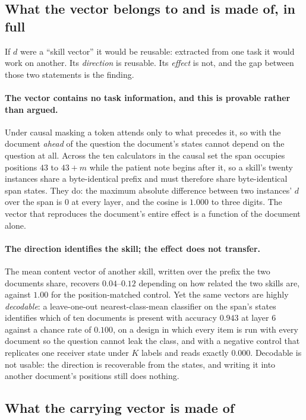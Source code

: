 \documentclass{article}
\newcommand{\dvec}{\ensuremath{d}}
\begin{document}
\subsection{What the vector belongs to and is made of, in full}
\label{app:belongs}

If $\dvec$ were a ``skill vector'' it would be reusable: extracted from one task
it would work on another. Its \emph{direction} is reusable. Its \emph{effect} is
not, and the gap between those two statements is the finding.

\paragraph{The vector contains no task information, and this is provable rather
than argued.} Under causal masking a token attends only to what precedes it, so
with the document \emph{ahead} of the question the document's states cannot
depend on the question at all. Across the ten calculators in the causal set the
span occupies positions $43$ to $43+m$ while the patient note begins after it,
so a skill's twenty instances share a byte-identical prefix and must therefore
share byte-identical span states. They do: the maximum absolute difference
between two instances' $\dvec$ over the span is $0$ at every layer, and the
cosine is $1.000$ to three digits. The vector that reproduces the document's
entire effect is a function of the document alone.

\paragraph{The direction identifies the skill; the effect does not transfer.}
The mean content vector of another skill, written over the prefix the two
documents share, recovers $0.04$--$0.12$ depending on how related the two
skills are, against $1.00$ for the position-matched control. Yet the same
vectors are highly \emph{decodable}: a leave-one-out nearest-class-mean
classifier on the span's states identifies which of ten documents is present
with accuracy $0.943$ at layer 6 against a chance rate of $0.100$, on a design
in which every item is run with every document so the question cannot leak the
class, and with a negative control that replicates one receiver state under $K$
labels and reads exactly $0.000$. Decodable is not usable: the direction is
recoverable from the states, and writing it into another document's positions
still does nothing.

\subsection{What the carrying vector is made of}
\label{sec:whose:docklast}
\end{document}
